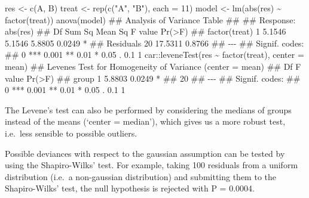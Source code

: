 \documentclass[a4paper,12pt,oneside]{book}
\newenvironment{Shaded}{\begin{snugshade}}{\end{snugshade}}
\newcommand{\DecValTok}[1]{#1}
\newcommand{\SpecialCharTok}[1]{#1}
\newcommand{\StringTok}[1]{#1}
\newcommand{\DocumentationTok}[1]{#1}
\newcommand{\OtherTok}[1]{#1}
\newcommand{\FunctionTok}[1]{#1}
\newcommand{\AttributeTok}[1]{#1}
\newcommand{\NormalTok}[1]{#1}
\begin{document}
\begin{Shaded}
\begin{Highlighting}[]
\NormalTok{res }\OtherTok{\textless{}{-}} \FunctionTok{c}\NormalTok{(A, B)}
\NormalTok{treat }\OtherTok{\textless{}{-}} \FunctionTok{rep}\NormalTok{(}\FunctionTok{c}\NormalTok{(}\StringTok{"A"}\NormalTok{, }\StringTok{"B"}\NormalTok{), }\AttributeTok{each =} \DecValTok{11}\NormalTok{)}
\NormalTok{model }\OtherTok{\textless{}{-}} \FunctionTok{lm}\NormalTok{(}\FunctionTok{abs}\NormalTok{(res) }\SpecialCharTok{\textasciitilde{}} \FunctionTok{factor}\NormalTok{(treat))}
\FunctionTok{anova}\NormalTok{(model)}
\DocumentationTok{\#\# Analysis of Variance Table}
\DocumentationTok{\#\# }
\DocumentationTok{\#\# Response: abs(res)}
\DocumentationTok{\#\#               Df  Sum Sq Mean Sq F value Pr(\textgreater{}F)  }
\DocumentationTok{\#\# factor(treat)  1  5.1546  5.1546  5.8805 0.0249 *}
\DocumentationTok{\#\# Residuals     20 17.5311  0.8766                 }
\DocumentationTok{\#\# {-}{-}{-}}
\DocumentationTok{\#\# Signif. codes:  }
\DocumentationTok{\#\# 0 \textquotesingle{}***\textquotesingle{} 0.001 \textquotesingle{}**\textquotesingle{} 0.01 \textquotesingle{}*\textquotesingle{} 0.05 \textquotesingle{}.\textquotesingle{} 0.1 \textquotesingle{} \textquotesingle{} 1}
\NormalTok{car}\SpecialCharTok{::}\FunctionTok{leveneTest}\NormalTok{(res }\SpecialCharTok{\textasciitilde{}} \FunctionTok{factor}\NormalTok{(treat), }\AttributeTok{center =}\NormalTok{ mean)}
\DocumentationTok{\#\# Levene\textquotesingle{}s Test for Homogeneity of Variance (center = mean)}
\DocumentationTok{\#\#       Df F value Pr(\textgreater{}F)  }
\DocumentationTok{\#\# group  1  5.8803 0.0249 *}
\DocumentationTok{\#\#       20                 }
\DocumentationTok{\#\# {-}{-}{-}}
\DocumentationTok{\#\# Signif. codes:  }
\DocumentationTok{\#\# 0 \textquotesingle{}***\textquotesingle{} 0.001 \textquotesingle{}**\textquotesingle{} 0.01 \textquotesingle{}*\textquotesingle{} 0.05 \textquotesingle{}.\textquotesingle{} 0.1 \textquotesingle{} \textquotesingle{} 1}
\end{Highlighting}
\end{Shaded}

The Levene's test can also be performed by considering the medians of groups instead of the means (`center = median'), which gives us a more robust test, i.e.~less sensible to possible outliers.

Possible deviances with respect to the gaussian assumption can be tested by using the Shapiro-Wilks' test. For example, taking 100 residuals from a uniform distribution (i.e.~a non-gaussian distribution) and submitting them to the Shapiro-Wilks' test, the null hypothesis is rejected with P = 0.0004.
\end{document}
